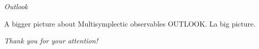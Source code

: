 \documentclass[10pt]{beamer}
\begin{document}
\begin{frame}
	\begin{center}
	\Huge\emph{Outlook}
	\end{center}
\end{frame}
\addtocounter{framenumber}{-1}

\begin{frame}[fragile]{A bigger picture about Multisymplectic observables}
	OUTLOOK. La big picture. 
\end{frame}






	\begin{frame}{}
	\label{frame:thankyouslide}
		\vfill
	  \centering 
	  {\Huge\color{red} 
	  \emph{Thank you for your attention!}}
		\vfill
		\centering
	\end{frame}






\appendix
\renewcommand{\insertframenumber}{\Alph{framenumber}}
\end{document}

